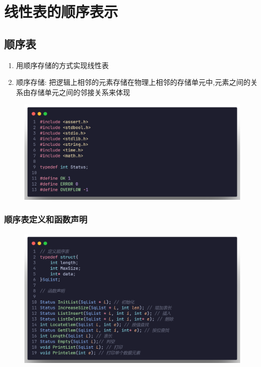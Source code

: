 \section{线性表的顺序表示}
\subsection{顺序表}
\begin{definition}[顺序表]
    \begin{enumerate}
        \item 用顺序存储的方式实现线性表
        \item 顺序存储: 把逻辑上相邻的元素存储在物理上相邻的存储单元中,元素之间的关系由存储单元之间的邻接关系来体现
    \end{enumerate}
\end{definition}

\begin{figure}[H]
    \centering
    \includegraphics[scale=0.2]{"figure/Note/LinearList/common.png"}
\end{figure} 

\subsubsection{顺序表定义和函数声明}
\begin{figure}[H]
    \centering
    \includegraphics[scale=0.2]{"figure/Note/LinearList/SqFunction.png"}
\end{figure} 

